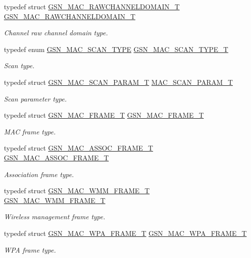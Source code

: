 \begin{DoxyCompactItemize}
typedef struct \hyperlink{a00127}{GSN\_\-MAC\_\-RAWCHANNELDOMAIN\_\-T} \hyperlink{a00642_gab8bb3634782377a5a3fd1c09ad5bedca}{GSN\_\-MAC\_\-RAWCHANNELDOMAIN\_\-T}
\begin{DoxyCompactList}\small\item\em Channel raw channel domain type. \end{DoxyCompactList}\item 
typedef enum \hyperlink{a00642_gacd7033290927ecd0c0b3b6e9829ecb2e}{GSN\_\-MAC\_\-SCAN\_\-TYPE} \hyperlink{a00642_ga25b1673dd1960a988e38a58156a53fd2}{GSN\_\-MAC\_\-SCAN\_\-TYPE\_\-T}
\begin{DoxyCompactList}\small\item\em Scan type. \end{DoxyCompactList}\item 
typedef struct \hyperlink{a00130}{GSN\_\-MAC\_\-SCAN\_\-PARAM\_\-T} \hyperlink{a00642_ga224c46962ac3e8d21a5dfc0d1a565391}{MAC\_\-SCAN\_\-PARAM\_\-T}
\begin{DoxyCompactList}\small\item\em Scan parameter type. \end{DoxyCompactList}\item 
typedef struct \hyperlink{a00116}{GSN\_\-MAC\_\-FRAME\_\-T} \hyperlink{a00642_gabe8a532741138f69c4e27fc2bb44af8c}{GSN\_\-MAC\_\-FRAME\_\-T}
\begin{DoxyCompactList}\small\item\em MAC frame type. \end{DoxyCompactList}\item 
typedef struct \hyperlink{a00109}{GSN\_\-MAC\_\-ASSOC\_\-FRAME\_\-T} \hyperlink{a00642_gab32a90b2661aaffd2fb7960c34e4bf76}{GSN\_\-MAC\_\-ASSOC\_\-FRAME\_\-T}
\begin{DoxyCompactList}\small\item\em Association frame type. \end{DoxyCompactList}\item 
typedef struct \hyperlink{a00136}{GSN\_\-MAC\_\-WMM\_\-FRAME\_\-T} \hyperlink{a00642_gab14ec7de1faea7e197f97d61281085fc}{GSN\_\-MAC\_\-WMM\_\-FRAME\_\-T}
\begin{DoxyCompactList}\small\item\em Wireless management frame type. \end{DoxyCompactList}\item 
typedef struct \hyperlink{a00137}{GSN\_\-MAC\_\-WPA\_\-FRAME\_\-T} \hyperlink{a00642_gadc2ef85538f39a0b8e01d199ccad1630}{GSN\_\-MAC\_\-WPA\_\-FRAME\_\-T}
\begin{DoxyCompactList}\small\item\em WPA frame type. \end{DoxyCompactList}\item 

\end{DoxyCompactItemize}
